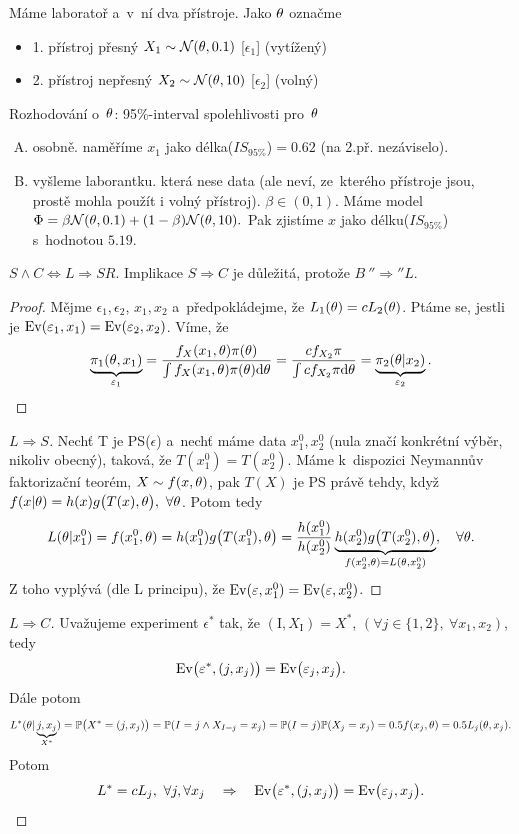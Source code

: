 \begin{example}
	Máme laboratoř a~v~ní dva přístroje. Jako $\theta$ označme\begin{itemize}
		\item 1. přístroj přesný $X_1\sim\mathcal{N}(\theta,0.1)$ [$\epsilon_1$] (vytížený)
		\item 2. přístroj nepřesný $X_2\sim\mathcal{N}(\theta,10)$ [$\epsilon_2$] (volný)
	\end{itemize}
Rozhodování o~$\theta$: 95\%-interval spolehlivosti pro~$\theta$\begin{enumerate}[A)]
	\item osobně. naměříme $x_1$ jako délka($IS_{95\%}$)$=0.62$ (na 2.př. nezáviselo).
	\item vyšleme laborantku. která nese data (ale neví, ze~kterého přístroje jsou, prostě mohla použít i volný přístroj). $\beta\in(0,1)$. Máme model $\Phi=\beta\mathcal{N}(\theta,0.1)+(1-\beta)\mathcal{N}(\theta,10).$ Pak zjistíme $x$ jako délku($IS_{95\%}$) s~hodnotou $5.19$.
\end{enumerate}
\end{example}
\begin{theorem}
	$S\wedge C\Leftrightarrow L\Rightarrow SR$. Implikace $S\Rightarrow C$ je důležitá, protože $B~''\Rightarrow'' L$.
	\begin{proof}
		Mějme $\epsilon_1,\epsilon_2$, $x_1,x_2$ a~předpokládejme, že $L_1(\theta)=c L_2(\theta)$. Ptáme se, jestli je $\mathrm{Ev}(\varepsilon_1,x_1)=\mathrm{Ev}(\varepsilon_2,x_2)$. Víme, že $$ \underbrace{\pi_1(\theta,x_1)}_{\varepsilon_1}=\frac{f_X(x_1,\theta)\pi(\theta)}{\int f_X(x_1,\theta)\pi(\theta)\mathrm{d}\theta}=\frac{c f_{X_2}\pi}{\int c f_{X_2}\pi\mathrm{d}\theta}=\underbrace{\pi_2(\theta| x_2)}_{\varepsilon_2}.$$
	\end{proof}
\begin{proof}[$L\Rightarrow S$]
	Nechť T je PS($\epsilon$) a~nechť máme data $x_1^0,x_2^0$ (nula značí konkrétní výběr, nikoliv obecný), taková, že $T(x_1^0)=T(x_2^0)$. Máme k~dispozici Neymannův faktorizační teorém, $X\sim f(x,\theta)$, pak $T(X)$ je PS právě tehdy, když $f(x|\theta)=h(x)g\big(T(x),\theta \big),~\forall\theta$. Potom tedy 
	$$ L(\theta|x_1^0)=f(x_1^0,\theta)=h(x_1^0)g\big( T(x_1^0),\theta \big)=\frac{h(x_1^0)}{h(x_2^0)}\underbrace{h(x_2^0)g\big(T(x_2^0),\theta \big)}_{f(x_2^0,\theta)=L(\theta,x_2^0)},\quad\forall\theta.$$
	Z toho vyplývá (dle L principu), že $\mathrm{Ev}(\varepsilon,x_1^0)=\mathrm{Ev}(\varepsilon,x_2^0)$.

\end{proof}
\begin{proof}[$L\Rightarrow C$]
Uvažujeme experiment $\epsilon^*$ tak, že $(\mathrm{I},X_\mathrm{I})=X^*$, $(\forall j\in\{1,2\},~\forall x_1,x_2)$, tedy $$\mathrm{Ev}\big(\varepsilon^*,(j,x_j) \big)=\mathrm{Ev}\big(\varepsilon_j,x_j \big).$$
Dále potom $$ L^*(\theta|\underbrace{j,x_j}_{X^*})=\mathbb{P}\big(X^*=(j,x_j) \big)=\mathbb{P}(I=j\wedge X_{I=j}=x_j)=\mathbb{P}(I=j)\mathbb{P}(X_j=x_j)=0.5f(x_j,\theta)=0.5 L_j(\theta,x_j).$$
Potom 
$$L^*=c L_j,~ \forall j,\forall x_j\quad\Rightarrow\quad\mathrm{Ev}\big(\varepsilon^*,(j,x_j) \big)=\mathrm{Ev}\big(\varepsilon_j,x_j \big).$$
\end{proof}
\end{theorem}


